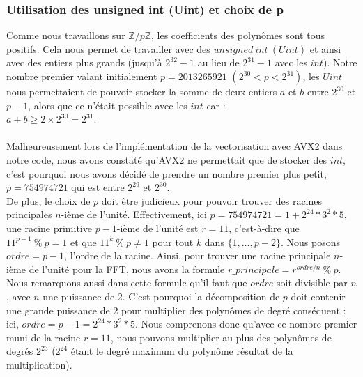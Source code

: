\documentclass[12pt, a4paper]{article}
\begin{document}
\subsubsection{Utilisation des unsigned int (Uint) et choix de p}

Comme nous travaillons sur $\mathbb{Z}/p\mathbb{Z}$, les coefficients des polynômes sont tous positifs. Cela nous permet de travailler avec des $unsigned\ int\ (Uint)$ et ainsi avec des entiers plus grands (jusqu’à $2^{32}-1$ au lieu de $2^{31}-1$ avec les $int$). Notre nombre premier valant initialement \linebreak $p=2013265921$ $(2^{30} < p < 2^{31})$, les $Uint$ nous permettaient de pouvoir stocker la somme de deux entiers $a$ et $b$ entre $2^{30}$ et $p-1$, alors que ce n'était possible avec les $int$ car : \\ $a+b\geq2\times2^{30}=2^{31}$. \\ \\
\indent Malheureusement lors de l'implémentation de la vectorisation avec AVX2 dans notre code, nous avons constaté qu'AVX2 ne permettait que de stocker des $int$, c'est pourquoi nous avons décidé de prendre un nombre premier plus petit, $p=754974721$ qui est entre $2^{29}$ et  $2^{30}$. \\
\indent De plus, le choix de $p$ doit être judicieux pour pouvoir trouver des racines principales $n$-ième de l'unité. Effectivement, ici $p = 754974721 = 1+2^{24}*3^2*5$, une racine primitive $p-1$-ième de l'unité est $r = 11$, c'est-à-dire que $11^{p-1}\ \%\ p = 1$ et que $11^{k}\ \%\ p \ne 1$ pour tout $k$ dans $\{1,\dots,p-2\}$. Nous posons $ordre = p-1$, l'ordre de la racine. Ainsi, pour trouver une racine principale $n$-ième de l'unité pour la FFT, nous avons la formule $r\_principale = r^{ordre/n}\ \% \ p$. \\
\indent Nous remarquons aussi dans cette formule qu'il faut que $ordre$ soit divisible par $n$, avec $n$ une puissance de 2. C'est pourquoi la décomposition de $p$ doit contenir une grande puissance de 2 pour multiplier des polynômes de degré conséquent : ici, $ordre = p-1 = 2^{24}*3^2*5$. Nous comprenons donc qu'avec ce nombre premier muni de la racine $r = 11$, nous pouvons multiplier au plus des polynômes de degrés $2^{23}$ ($2^{24}$ étant le degré maximum du polynôme résultat de la multiplication).
\end{document}
